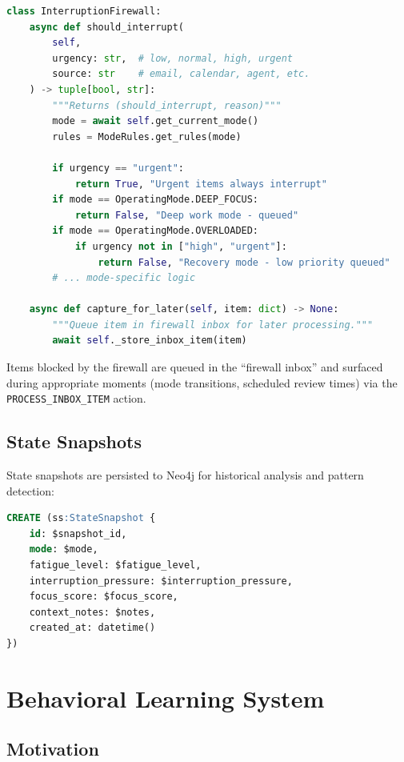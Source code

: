 \documentclass[11pt,a4paper]{article}
\begin{document}
\begin{lstlisting}[language=Python]
class InterruptionFirewall:
    async def should_interrupt(
        self,
        urgency: str,  # low, normal, high, urgent
        source: str    # email, calendar, agent, etc.
    ) -> tuple[bool, str]:
        """Returns (should_interrupt, reason)"""
        mode = await self.get_current_mode()
        rules = ModeRules.get_rules(mode)

        if urgency == "urgent":
            return True, "Urgent items always interrupt"
        if mode == OperatingMode.DEEP_FOCUS:
            return False, "Deep work mode - queued"
        if mode == OperatingMode.OVERLOADED:
            if urgency not in ["high", "urgent"]:
                return False, "Recovery mode - low priority queued"
        # ... mode-specific logic

    async def capture_for_later(self, item: dict) -> None:
        """Queue item in firewall inbox for later processing."""
        await self._store_inbox_item(item)
\end{lstlisting}

Items blocked by the firewall are queued in the ``firewall inbox'' and surfaced during appropriate moments (mode transitions, scheduled review times) via the \texttt{PROCESS\_INBOX\_ITEM} action.

\subsection{State Snapshots}

State snapshots are persisted to Neo4j for historical analysis and pattern detection:

\begin{lstlisting}[language=SQL]
CREATE (ss:StateSnapshot {
    id: $snapshot_id,
    mode: $mode,
    fatigue_level: $fatigue_level,
    interruption_pressure: $interruption_pressure,
    focus_score: $focus_score,
    context_notes: $notes,
    created_at: datetime()
})
\end{lstlisting}

\section{Behavioral Learning System}
\label{sec:learning}

\subsection{Motivation}
\end{document}
